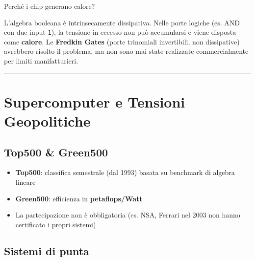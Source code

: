 \documentclass[
  italian,
  openany]{book}
\providecommand{\tightlist}{%
  \setlength{\itemsep}{0pt}\setlength{\parskip}{0pt}}
\begin{document}
\begin{callouttip}{Perché i chip generano calore?}

L'algebra booleana è intrinsecamente dissipativa. Nelle porte logiche
(es. AND con due input \texttt{1}), la tensione in eccesso non può
accumularsi e viene disposta come \textbf{calore}. Le \textbf{Fredkin
Gates} (porte trinomiali invertibili, non dissipative) avrebbero risolto
il problema, ma non sono mai state realizzate commercialmente per limiti
manifatturieri.

\end{callouttip}

\begin{center}\rule{0.5\linewidth}{0.5pt}\end{center}

\section{Supercomputer e Tensioni
Geopolitiche}\label{supercomputer-e-tensioni-geopolitiche}

\subsection{Top500 \& Green500}\label{top500-green500}

\begin{itemize}
\tightlist
\item
  \textbf{Top500}: classifica semestrale (dal 1993) basata su benchmark
  di algebra lineare
\item
  \textbf{Green500}: efficienza in \textbf{petaflops/Watt}
\item
  La partecipazione non è obbligatoria (es. NSA, Ferrari nel 2003 non
  hanno certificato i propri sistemi)
\end{itemize}

\subsection{Sistemi di punta}\label{sistemi-di-punta}
\end{document}
